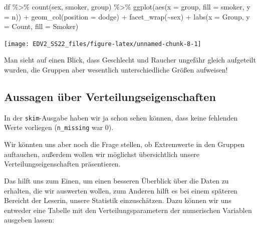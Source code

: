 \documentclass[
]{book}
\newenvironment{Shaded}{\begin{snugshade}}{\end{snugshade}}
\newcommand{\AttributeTok}[1]{\textcolor[rgb]{0.77,0.63,0.00}{#1}}
\newcommand{\FunctionTok}[1]{\textcolor[rgb]{0.00,0.00,0.00}{#1}}
\newcommand{\NormalTok}[1]{#1}
\newcommand{\SpecialCharTok}[1]{\textcolor[rgb]{0.00,0.00,0.00}{#1}}
\newcommand{\StringTok}[1]{\textcolor[rgb]{0.31,0.60,0.02}{#1}}
\begin{document}
\begin{Shaded}
\begin{Highlighting}[]
\NormalTok{df }\SpecialCharTok{\%\textgreater{}\%} 
  \FunctionTok{count}\NormalTok{(sex, smoker, group) }\SpecialCharTok{\%\textgreater{}\%} 
  \FunctionTok{ggplot}\NormalTok{(}\FunctionTok{aes}\NormalTok{(}\AttributeTok{x =}\NormalTok{ group, }\AttributeTok{fill =}\NormalTok{ smoker, }\AttributeTok{y =}\NormalTok{ n)) }\SpecialCharTok{+}
  \FunctionTok{geom\_col}\NormalTok{(}\AttributeTok{position =} \StringTok{\textquotesingle{}dodge\textquotesingle{}}\NormalTok{) }\SpecialCharTok{+}
  \FunctionTok{facet\_wrap}\NormalTok{(}\SpecialCharTok{\textasciitilde{}}\NormalTok{sex) }\SpecialCharTok{+}
  \FunctionTok{labs}\NormalTok{(}\AttributeTok{x =} \StringTok{\textquotesingle{}Group\textquotesingle{}}\NormalTok{,}
       \AttributeTok{y =} \StringTok{\textquotesingle{}Count\textquotesingle{}}\NormalTok{,}
       \AttributeTok{fill =} \StringTok{\textquotesingle{}Smoker\textquotesingle{}}\NormalTok{)}
\end{Highlighting}
\end{Shaded}

\begin{center}\texttt{[image: EDV2\_SS22\_files/figure-latex/unnamed-chunk-8-1]} \end{center}

Man sieht auf einen Blick, dass Geschlecht und Raucher ungefähr gleich aufgeteilt wurden, die Gruppen aber wesentlich unterschiedliche Größen aufweisen!

\hypertarget{aussagen-uxfcber-verteilungseigenschaften}{%
\subsection{Aussagen über Verteilungseigenschaften}\label{aussagen-uxfcber-verteilungseigenschaften}}

In der \texttt{skim}-Ausgabe haben wir ja schon sehen können, dass keine fehlenden Werte vorliegen (\texttt{n\_missing} war 0).

Wir könnten uns aber noch die Frage stellen, ob Extremwerte in den Gruppen auftauchen, außerdem wollen wir möglichst übersichtlich unsere Verteilungseigenschaften präsentieren.

Das hilft uns zum Einen, um einen besseren Überblick über die Daten zu erhalten, die wir auswerten wollen, zum Anderen hilft es bei einem späteren Bereicht der Leserin, unsere Statistik einzuschätzen.
Dazu können wir uns entweder eine Tabelle mit den Verteilungsparametern der numerischen Variablen ausgeben lassen:
\end{document}
